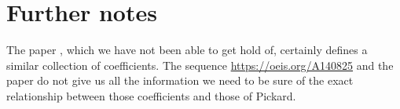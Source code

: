 \documentclass{article}
\begin{document}
\section{Further notes}
The paper \cite{curtz}, which we have not been able to get hold of, certainly defines a similar collection of coefficients. The sequence \url{https://oeis.org/A140825} and the paper \cite{flajolet} do not give us all the information we need to be sure of the exact relationship between those coefficients and those of Pickard.




\end{document}
